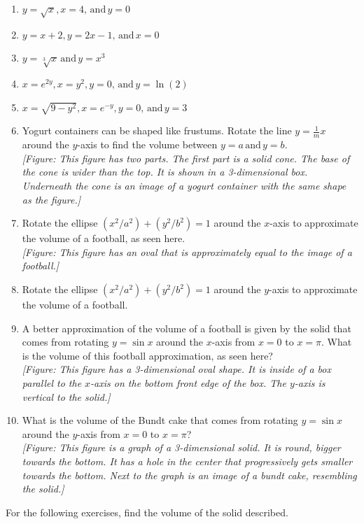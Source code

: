 \documentclass{exercises}
\begin{document}
\begin{enumerate}[resume]
\item $y=\sqrt{x},x=4,\,\text{and}\,y=0$
\item $y=x+2,y=2x-1,\,\text{and}\,x=0$
\item $y=\sqrt[3]{x}\,\text{and}\,y=x^{3}$
\item $x=e^{2y},x=y^{2},y=0,\,\text{and}\,y=\ln(2)$
\item $x=\sqrt{9-y^{2}},x=e^{-y},y=0,\,\text{and}\,y=3$
\item Yogurt containers can be shaped like frustums. Rotate the line $y=\frac{1}{m}x$ around the $y$-axis to find the volume between $y=a\,\text{and}\,y=b$. \\ \textit{[Figure: This figure has two parts. The first part is a solid cone. The base of the cone is wider than the top. It is shown in a 3-dimensional box. Underneath the cone is an image of a yogurt container with the same shape as the figure.]}
\item Rotate the ellipse $(x^{2}/a^{2})+(y^{2}/b^{2})=1$ around the $x$-axis to approximate the volume of a football, as seen here. \\ \textit{[Figure: This figure has an oval that is approximately equal to the image of a football.]}
\item Rotate the ellipse $(x^{2}/a^{2})+(y^{2}/b^{2})=1$ around the $y$-axis to approximate the volume of a football.
\item A better approximation of the volume of a football is given by the solid that comes from rotating $y=\sin x$ around the $x$-axis from $x=0$ to $x=\pi$. What is the volume of this football approximation, as seen here? \\ \textit{[Figure: This figure has a 3-dimensional oval shape. It is inside of a box parallel to the $x$-axis on the bottom front edge of the box. The $y$-axis is vertical to the solid.]}
\item What is the volume of the Bundt cake that comes from rotating $y=\sin x$ around the $y$-axis from $x=0$ to $x=\pi$? \\ \textit{[Figure: This figure is a graph of a 3-dimensional solid. It is round, bigger towards the bottom. It has a hole in the center that progressively gets smaller towards the bottom. Next to the graph is an image of a bundt cake, resembling the solid.]}
\end{enumerate}

For the following exercises, find the volume of the solid described.
\end{document}
